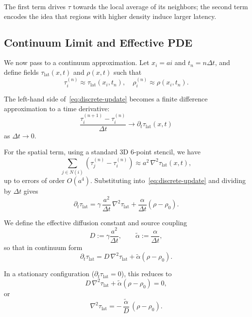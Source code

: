 The first term drives $\tau$ towards the local average of its neighbors; the
second term encodes the idea that regions with higher density induce larger
latency.

\subsection{Continuum Limit and Effective PDE}
We now pass to a continuum approximation. Let $x_i = a i$ and $t_n = n\Delta t$,
and define fields $\tau_{\mathrm{lat}}(x,t)$ and $\rho(x,t)$ such that
\begin{equation}
\tau_i^{(n)} \approx \tau_{\mathrm{lat}}(x_i, t_n), \quad
\rho_i^{(n)} \approx \rho(x_i, t_n).
\end{equation}

The left-hand side of~\eqref{eq:discrete-update} becomes a finite difference
approximation to a time derivative:
\begin{equation}
\frac{\tau_i^{(n+1)} - \tau_i^{(n)}}{\Delta t} \to \partial_t \tau_{\mathrm{lat}}(x,t)
\end{equation}
as $\Delta t \to 0$.

For the spatial term, using a standard 3D 6-point stencil, we have
\begin{equation}
\sum_{j \in N(i)} (\tau_j^{(n)} - \tau_i^{(n)})
  \approx a^2 \, \nabla^2 \tau_{\mathrm{lat}}(x,t),
\end{equation}
up to errors of order $O(a^4)$. Substituting into~\eqref{eq:discrete-update}
and dividing by $\Delta t$ gives
\begin{equation}
\partial_t \tau_{\mathrm{lat}}
  = \gamma \, \frac{a^2}{\Delta t} \, \nabla^2 \tau_{\mathrm{lat}}
    + \frac{\alpha}{\Delta t} (\rho - \rho_0).
\end{equation}

We define the effective diffusion constant and source coupling
\begin{equation}
D := \gamma \frac{a^2}{\Delta t}, \qquad
\tilde{\alpha} := \frac{\alpha}{\Delta t},
\end{equation}
so that in continuum form
\begin{equation}
\partial_t \tau_{\mathrm{lat}} = D \, \nabla^2 \tau_{\mathrm{lat}} + \tilde{\alpha} (\rho - \rho_0).
\end{equation}

In a stationary configuration ($\partial_t \tau_{\mathrm{lat}} = 0$), this
reduces to
\begin{equation}
D \, \nabla^2 \tau_{\mathrm{lat}} + \tilde{\alpha} (\rho - \rho_0) = 0,
\end{equation}
or
\begin{equation}
\nabla^2 \tau_{\mathrm{lat}} = - \, \frac{\tilde{\alpha}}{D} \, (\rho - \rho_0).
\label{eq:tau-poisson}
\end{equation}


